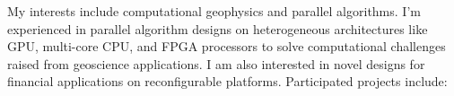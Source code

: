 \documentclass[11pt, a4paper]{awesome-cv}
\begin{document}


\begin{cvparagraph}
My interests include computational geophysics and parallel algorithms. I'm experienced in parallel algorithm designs on heterogeneous architectures like GPU, multi-core CPU, and FPGA processors to solve computational challenges raised from geoscience applications. I am also interested in novel designs for financial applications on reconfigurable platforms. Participated projects include:
\end{cvparagraph}
\end{document}
